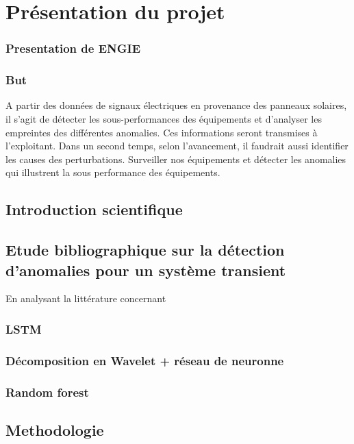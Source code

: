 


\chapter{Présentation du projet}

\subsection{Presentation de ENGIE}

\subsection{But}
A partir des données de signaux électriques en provenance des panneaux solaires, il s’agit de détecter les sous-performances des équipements et d’analyser les empreintes des différentes anomalies. Ces informations seront transmises à l’exploitant. Dans un second temps, selon l’avancement, il faudrait aussi identifier les causes des perturbations.
Surveiller nos équipements et détecter les anomalies qui illustrent la sous performance des équipements.


\section{Introduction scientifique}

\section{Etude bibliographique sur la détection d'anomalies pour un système transient}
En analysant la littérature concernant 
\subsection{LSTM}

\subsection{Décomposition en Wavelet + réseau de neuronne}

\subsection{Random forest}





\section{Methodologie}

